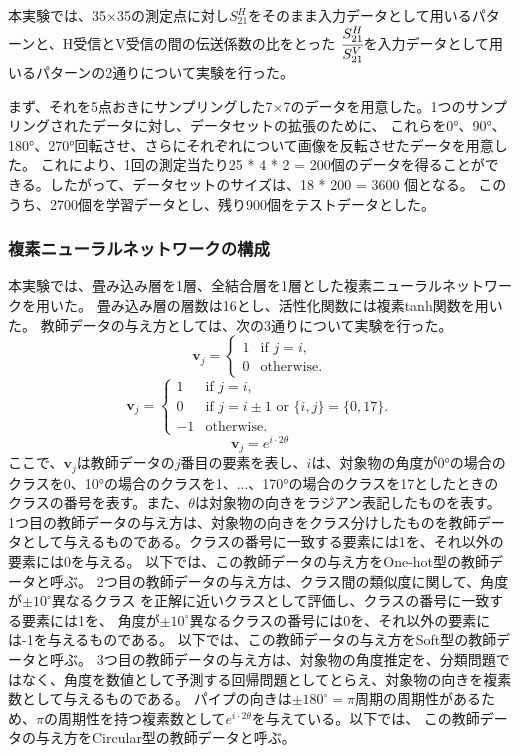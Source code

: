 \documentclass[11pt,a4paper,uplatex]{ujarticle}
\begin{document}
  本実験では、35×35の測定点に対し$S_{21}^{H}$をそのまま入力データとして用いるパターンと、H受信とV受信の間の伝送係数の比をとった
  $\cfrac{S_{21}^{H}}{S_{21}^{V}}$を入力データとして用いるパターンの2通りについて実験を行った。

  まず、それを5点おきにサンプリングした7×7のデータを用意した。1つのサンプリングされたデータに対し、データセットの拡張のために、
  これらを0°、90°、180°、270°回転させ、さらにそれぞれについて画像を反転させたデータを用意した。
  これにより、1回の測定当たり25 * 4 * 2 = 200個のデータを得ることができる。したがって、データセットのサイズは、18 * 200 = 3600 個となる。
  このうち、2700個を学習データとし、残り900個をテストデータとした。
  
  \subsubsection{複素ニューラルネットワークの構成}
  本実験では、畳み込み層を1層、全結合層を1層とした複素ニューラルネットワークを用いた。
  畳み込み層の層数は16とし、活性化関数には複素tanh関数を用いた。
  教師データの与え方としては、次の3通りについて実験を行った。
  \begin{equation}\label{eq:onehot}
    \mathbf{v}_j =
    \begin{cases}
        1 & \text{if } j = i, \\
        0 & \text{otherwise}.
    \end{cases}
  \end{equation}
  \begin{equation}\label{eq:soft}
    \mathbf{v}_j =
    \begin{cases}
        1 & \text{if } j = i, \\
        0 & \text{if } j = i \pm 1 \text{ or } \{i, j\} = \{0, 17\}.\\
        -1 & \text{otherwise}.
    \end{cases}
  \end{equation}
  \begin{equation}\label{eq:circular}
    \mathbf{v}_j = e^{i\cdot2\theta}
  \end{equation}
  ここで、$\mathbf{v}_j$は教師データの$j$番目の要素を表し、$i$は、対象物の角度が0°の場合のクラスを0、10°の場合のクラスを1、...、170°の場合のクラスを17としたときの
  クラスの番号を表す。また、$\theta$は対象物の向きをラジアン表記したものを表す。
  1つ目の教師データの与え方は、対象物の向きをクラス分けしたものを教師データとして与えるものである。クラスの番号に一致する要素には1を、それ以外の要素には0を与える。
  以下では、この教師データの与え方をOne-hot型の教師データと呼ぶ。
  2つ目の教師データの与え方は、クラス間の類似度に関して、角度が$\pm10^{\circ}$異なるクラス
  を正解に近いクラスとして評価し、クラスの番号に一致する要素には1を、 角度が$\pm10^{\circ}$異なるクラスの番号には0を、それ以外の要素には-1を与えるものである。
  以下では、この教師データの与え方をSoft型の教師データと呼ぶ。
  3つ目の教師データの与え方は、対象物の角度推定を、分類問題ではなく、角度を数値として予測する回帰問題としてとらえ、対象物の向きを複素数として与えるものである。
  パイプの向きは$\pm180^{\circ} = \pi$周期の周期性があるため、$\pi$の周期性を持つ複素数として$e^{i\cdot2\theta}$を与えている。以下では、
  この教師データの与え方をCircular型の教師データと呼ぶ。
\end{document}
